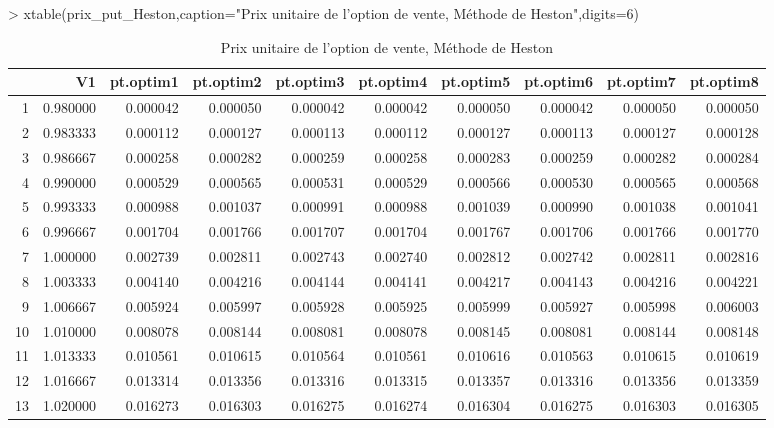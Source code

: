 \documentclass[letter]{report}
\begin{document}
\begin{Schunk}
\begin{Sinput}
> 	xtable(prix_put_Heston,caption="Prix unitaire de l'option de vente, Méthode de Heston",digits=6)
\end{Sinput}
% latex table generated in R 3.0.2 by xtable 1.7-4 package
% Mon Oct 13 12:28:07 2014
\begin{table}[ht]
\centering
\begin{tabular}{rrrrrrrrrr}
  \hline
 & V1 & pt.optim1 & pt.optim2 & pt.optim3 & pt.optim4 & pt.optim5 & pt.optim6 & pt.optim7 & pt.optim8 \\ 
  \hline
1 & 0.980000 & 0.000042 & 0.000050 & 0.000042 & 0.000042 & 0.000050 & 0.000042 & 0.000050 & 0.000050 \\ 
  2 & 0.983333 & 0.000112 & 0.000127 & 0.000113 & 0.000112 & 0.000127 & 0.000113 & 0.000127 & 0.000128 \\ 
  3 & 0.986667 & 0.000258 & 0.000282 & 0.000259 & 0.000258 & 0.000283 & 0.000259 & 0.000282 & 0.000284 \\ 
  4 & 0.990000 & 0.000529 & 0.000565 & 0.000531 & 0.000529 & 0.000566 & 0.000530 & 0.000565 & 0.000568 \\ 
  5 & 0.993333 & 0.000988 & 0.001037 & 0.000991 & 0.000988 & 0.001039 & 0.000990 & 0.001038 & 0.001041 \\ 
  6 & 0.996667 & 0.001704 & 0.001766 & 0.001707 & 0.001704 & 0.001767 & 0.001706 & 0.001766 & 0.001770 \\ 
  7 & 1.000000 & 0.002739 & 0.002811 & 0.002743 & 0.002740 & 0.002812 & 0.002742 & 0.002811 & 0.002816 \\ 
  8 & 1.003333 & 0.004140 & 0.004216 & 0.004144 & 0.004141 & 0.004217 & 0.004143 & 0.004216 & 0.004221 \\ 
  9 & 1.006667 & 0.005924 & 0.005997 & 0.005928 & 0.005925 & 0.005999 & 0.005927 & 0.005998 & 0.006003 \\ 
  10 & 1.010000 & 0.008078 & 0.008144 & 0.008081 & 0.008078 & 0.008145 & 0.008081 & 0.008144 & 0.008148 \\ 
  11 & 1.013333 & 0.010561 & 0.010615 & 0.010564 & 0.010561 & 0.010616 & 0.010563 & 0.010615 & 0.010619 \\ 
  12 & 1.016667 & 0.013314 & 0.013356 & 0.013316 & 0.013315 & 0.013357 & 0.013316 & 0.013356 & 0.013359 \\ 
  13 & 1.020000 & 0.016273 & 0.016303 & 0.016275 & 0.016274 & 0.016304 & 0.016275 & 0.016303 & 0.016305 \\ 
   \hline
\end{tabular}
\caption{Prix unitaire de l'option de vente, Méthode de Heston} 
\end{table}\end{Schunk}
\end{document}
